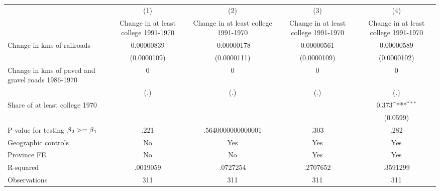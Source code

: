 {
\def\sym#1{\ifmmode^{#1}\else\(^{#1}\)\fi}
\begin{tabular}{l*{4}{c}}
\hline\hline
                &\multicolumn{1}{c}{(1)}&\multicolumn{1}{c}{(2)}&\multicolumn{1}{c}{(3)}&\multicolumn{1}{c}{(4)}\\
                &\multicolumn{1}{c}{Change in at least college 1991-1970}&\multicolumn{1}{c}{Change in at least college 1991-1970}&\multicolumn{1}{c}{Change in at least college 1991-1970}&\multicolumn{1}{c}{Change in at least college 1991-1970}\\
\hline
Change in kms of railroads&0.00000839         &-0.00000178         &0.00000561         &0.00000589         \\
                &(0.0000109)         &(0.0000111)         &(0.0000109)         &(0.0000102)         \\
[1em]
Change in kms of paved and gravel roads 1986-1970&        0         &        0         &        0         &        0         \\
                &      (.)         &      (.)         &      (.)         &      (.)         \\
[1em]
Share of at least college 1970&                  &                  &                  &    0.373\sym{***}\\
                &                  &                  &                  & (0.0599)         \\
\hline
P-value for testing $\beta\\_2 >= \beta\\_1$&     .221         &.5640000000000001         &     .303         &     .282         \\
Geographic controls&       No         &      Yes         &      Yes         &      Yes         \\
Province FE     &       No         &       No         &      Yes         &      Yes         \\
R-squared       & .0019059         & .0727254         & .2707652         & .3591299         \\
Observations    &      311         &      311         &      311         &      311         \\
\hline\hline
\end{tabular}
}
